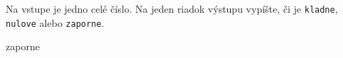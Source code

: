 




Na vstupe je jedno celé číslo. Na jeden riadok výstupu vypíšte, či je \texttt{kladne}, \texttt{nulove} alebo \texttt{zaporne}.

\vystup
zaporne
\koniec



